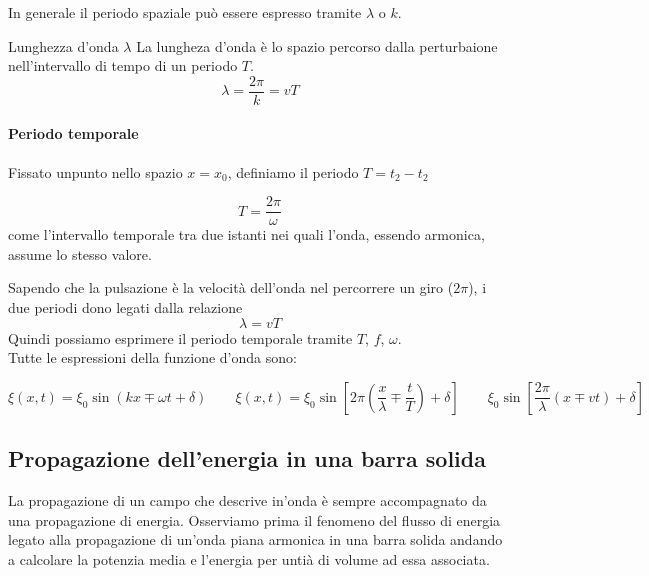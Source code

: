 \documentclass[x11names]{report}
\begin{document}
	In generale il periodo spaziale può essere espresso tramite \(\lambda\) o \(k\).
	
	\begin{center}
		\colorbox{yblue}{\begin{minipage}{5.75in}
				\begin{blues}{Lunghezza d'onda \(\lambda\)}
					La lungheza d'onda è lo spazio percorso dalla perturbaione nell'intervallo di tempo di un periodo \(T\).
					\[ 
					\lambda = \frac{2\pi}{k} = vT
					\]
				\end{blues}
		\end{minipage}}
	\end{center}
	
	\paragraph{Periodo temporale} Fissato unpunto nello spazio \(x=x_0\), definiamo il periodo \(T = t_2-t_2\)
	
	\[ T = \frac{2\pi}{\omega}\] 
	come l'intervallo temporale tra due istanti nei quali l'onda, essendo armonica, assume lo stesso valore.
	
	Sapendo che la pulsazione è la velocità dell'onda nel percorrere un giro (\(2\pi\)), i due periodi dono legati dalla relazione
	\[ 
	\lambda = vT
	\]
	Quindi possiamo esprimere il periodo temporale tramite \(T\), \(f\), \(\omega\).\\
	
	\noindent
	Tutte le espressioni della funzione d'onda sono:
	
	\[ 
	\xi(x,t) = \xi_0 \sin\left(kx \mp \omega t + \delta\right) \qquad \xi(x,t) = \xi_0 \sin\left[ 2\pi\left(\frac{x}{\lambda} \mp \frac{t}{T}\right) + \delta\right]  \qquad \xi_0\sin\left[\frac{2\pi}{\lambda}\left(x \mp vt\right) + \delta \right]
	\]
	

	\newpage
	\subsection{Propagazione dell'energia in una barra solida}
	La propagazione di un campo che descrive in'onda è sempre accompagnato da una propagazione di energia. Osserviamo prima il fenomeno del flusso di energia legato alla propagazione di un'onda piana armonica in una barra solida andando a calcolare la potenzia media e l'energia per untià di volume ad essa associata.\\
	
\end{document}
